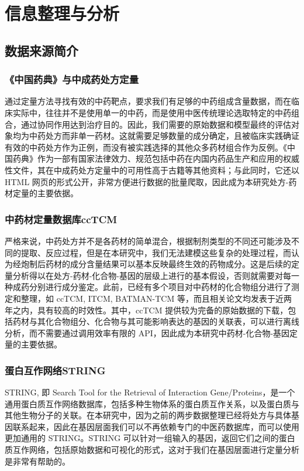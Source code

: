 
\chapter{信息整理与分析}

\section{数据来源简介}

\subsection{《中国药典》与中成药处方定量}

通过定量方法寻找有效的中药靶点，要求我们有足够的中药组成含量数据，而在临床实际中，往往并不是使用单一的中药，而是使用中医传统理论选取特定的中药组合，通过协同作用达到治疗目的。因此，我们需要的原始数据和模型最终的评估对象均为中药处方而非单一药材。这就需要足够数量的成分确定，且被临床实践确证有效的中药处方作为正例，而没有被实践选择的其他众多药材组合作为反例。《中国药典》作为一部有国家法律效力、规范包括中药在内国内药品生产和应用的权威性文件，其在中成药处方定量中的可用性高于古籍等其他资料；与此同时，它还以 HTML 网页的形式公开，非常方便进行数据的批量爬取，因此成为本研究处方-药材定量的主要依据。

\subsection{中药材定量数据库ccTCM}

严格来说，中药处方并不是各药材的简单混合，根据制剂类型的不同还可能涉及不同的提取、反应过程，但是在本研究中，我们无法建模这些复杂的处理过程，而认为经炮制后药材的成分含量结果可以基本反映最终生效的药物成分。这是后续的定量分析得以在处方-药材-化合物-基因的层级上进行的基本假设，否则就需要对每一种成药分别进行成分鉴定。此前，已经有多个项目对中药材的化合物组分进行了测定和整理，如 ccTCM, ITCM, BATMAN-TCM 等，而且相关论文均发表于近两年之内，具有较高的时效性。其中，ccTCM 提供较为完备的原始数据的下载，包括药材与其化合物组分、化合物与其可能影响表达的基因的关联表，可以进行离线分析，而不需要通过调用效率有限的 API，因此成为本研究中药材-化合物-基因定量的主要依据。

\subsection{蛋白互作网络STRING}

STRING, 即 Search Tool for the Retrieval of Interaction Gene/Proteins，是一个通用蛋白质互作网络数据库，包括多种生物体系的蛋白质互作关系，以及蛋白质与其他生物分子的关联。在本研究中，因为之前的两步数据整理已经将处方与具体基因联系起来，因此在基因层面我们可以不再依赖专门的中医药数据库，而可以使用更加通用的 STRING。STRING 可以针对一组输入的基因，返回它们之间的蛋白质互作网络，包括原始数据和可视化的形式，这对于我们在基因层面进行定量分析是非常有帮助的。

